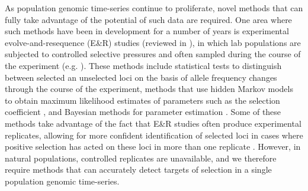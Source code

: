 As population genomic time-series continue to proliferate, novel methods that can fully take advantage of the potential of such data are required. One area where such methods have been in development for a number of years is experimental evolve-and-resequence (E\&R) studies (reviewed in \cite{schlottererCombiningExperimentalEvolution2015}), in which lab populations are subjected to controlled selective pressures and often sampled during the course of the experiment (e.g. \cite{illingworthQuantifyingSelectionActing2012,federIdentifyingSignaturesSelection2014,terhorstMultilocusAnalysisGenomic2015,otteDetectingSelectedHaplotype2021}). These methods include statistical tests to distinguish between selected an unselected loci on the basis of allele frequency changes through the course of the experiment, methods that use hidden Markov models to obtain maximum likelihood estimates of parameters such as the selection coefficient \cite{iranmehrCLEARCompositionLikelihoods2017,mathiesonEstimatingSelectionCoefficients2013,steinruckenNovelSpectralMethod2014}, and Bayesian methods for parameter estimation \cite{ferrer-admetllaApproximateMarkovModel2016,schraiberBayesianInferenceNatural2016}. Some of these methods take advantage of the fact that E\&R studies often produce experimental replicates, allowing for more confident identification of selected loci in cases where positive selection has acted on these loci in more than one replicate \cite{vlachosBenchmarkingSoftwareTools2019}. However, in natural populations, controlled replicates are unavailable, and we therefore require methods that can accurately detect targets of selection in a single population genomic time-series.

